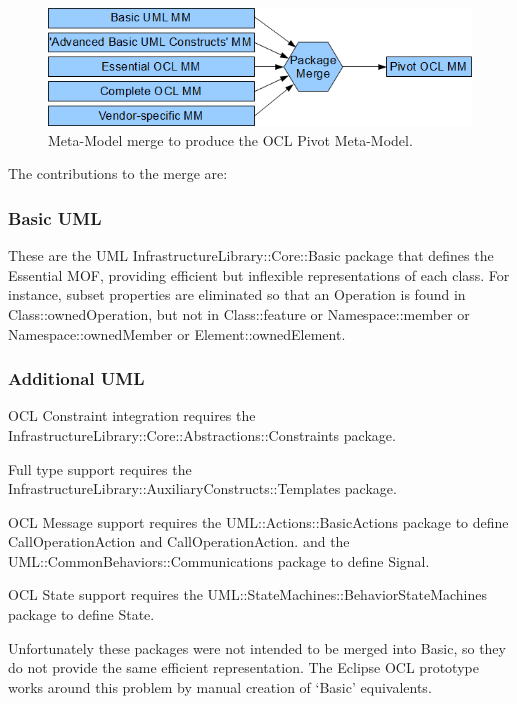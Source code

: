 \documentclass{eceasst}
\begin{document}
\begin{figure}
  \begin{center}
    \includegraphics[width=5.75in]{UMLMMtoOCLMM.png}
  \end{center}
  \caption{Meta-Model merge to produce the OCL Pivot Meta-Model.}
  \label{fig:UMLMMtoOCLMM}
\end{figure}

The contributions to the merge are:

\subsubsection{Basic UML}

These are the UML InfrastructureLibrary::Core::Basic package that defines the Essential MOF, providing efficient but inflexible representations of each class. For instance, subset properties are eliminated so that an Operation is found in Class::ownedOperation, but not in Class::feature or Namespace::member or Namespace::ownedMember or Element::ownedElement.

\subsubsection{Additional UML}

OCL Constraint integration requires the InfrastructureLibrary::Core::Abstractions::Constraints package.

Full type support requires the InfrastructureLibrary::AuxiliaryConstructs::Templates package.

OCL Message support requires the UML::Actions::BasicActions package to define CallOperationAction and CallOperationAction. and the UML::CommonBehaviors::Communications package to define Signal.

OCL State support requires the UML::StateMachines::BehaviorStateMachines package to define State.

Unfortunately these packages were not intended to be merged into Basic, so they do not provide the same efficient representation. The Eclipse OCL prototype works around this problem by manual creation of `Basic' equivalents.
\end{document}
